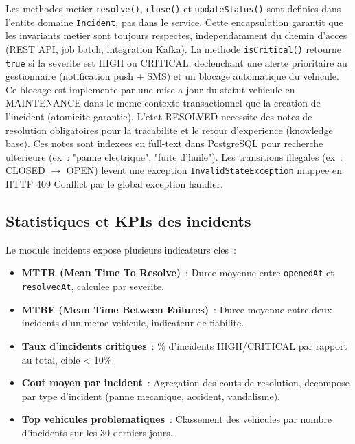 \documentclass[12pt,a4paper]{report}
\begin{document}
\begin{lecture}
Les methodes metier \texttt{resolve()}, \texttt{close()} et
\texttt{updateStatus()} sont definies dans l'entite domaine \texttt{Incident},
pas dans le service. Cette encapsulation garantit que les invariants
metier sont toujours respectes, independamment du chemin d'acces (REST API,
job batch, integration Kafka). La methode \texttt{isCritical()} retourne
\texttt{true} si la severite est HIGH ou CRITICAL, declenchant une alerte
prioritaire au gestionnaire (notification push + SMS) et un blocage automatique
du vehicule. Ce blocage est implemente par une mise a jour du statut vehicule
en MAINTENANCE dans le meme contexte transactionnel que la creation de
l'incident (atomicite garantie). L'etat RESOLVED necessite des notes de
resolution obligatoires pour la tracabilite et le retour d'experience
(knowledge base). Ces notes sont indexees en full-text dans PostgreSQL
pour recherche ulterieure (ex~: "panne electrique", "fuite d'huile").
Les transitions illegales (ex~: CLOSED $\to$ OPEN) levent une exception
\texttt{InvalidStateException} mappee en HTTP 409 Conflict par le
global exception handler.
\end{lecture}

\subsection{Statistiques et KPIs des incidents}

Le module incidents expose plusieurs indicateurs cles~:

\begin{itemize}[leftmargin=2cm]
  \item \textbf{MTTR (Mean Time To Resolve)}~: Duree moyenne entre
        \texttt{openedAt} et \texttt{resolvedAt}, calculee par severite.
        
  \item \textbf{MTBF (Mean Time Between Failures)}~: Duree moyenne entre
        deux incidents d'un meme vehicule, indicateur de fiabilite.
        
  \item \textbf{Taux d'incidents critiques}~: \% d'incidents HIGH/CRITICAL
        par rapport au total, cible < 10\%.
        
  \item \textbf{Cout moyen par incident}~: Agregation des couts de resolution,
        decompose par type d'incident (panne mecanique, accident, vandalisme).
        
  \item \textbf{Top vehicules problematiques}~: Classement des vehicules
        par nombre d'incidents sur les 30 derniers jours.
\end{itemize}
\end{document}
